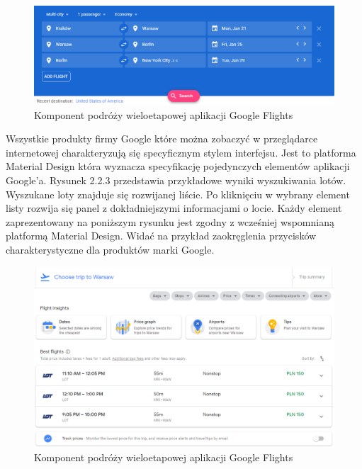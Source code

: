 \documentclass[12pt, twoside]{report}
\begin{document}
\begin{figure}[!ht]
\centering
\includegraphics[scale=0.60, keepaspectratio]{google_flights_multi.png}
\caption{Komponent podróży wieloetapowej aplikacji Google Flights}
\label{fig:google_flights_multi}
\end{figure}
Wszystkie produkty firmy Google które można zobaczyć w przeglądarce internetowej charakteryzują się specyficznym stylem interfejsu. Jest to platforma Material Design która wyznacza specyfikację pojedynczych elementów aplikacji Google'a. Rysunek 2.2.3 przedstawia przykładowe wyniki wyszukiwania lotów. Wyszukane loty znajduje się rozwijanej liście. Po kliknięciu w wybrany element listy rozwija się panel z dokładniejszymi informacjami o locie. Każdy element zaprezentowany na poniższym rysunku jest zgodny z wcześniej wspomnianą platformą Material Design. Widać na przykład zaokręglenia przycisków charakterystyczne dla produktów marki Google.
 
\begin{figure}[!ht]
\centering
\includegraphics[scale=0.50, keepaspectratio]{google_flights_result.png}
\caption{Komponent podróży wieloetapowej aplikacji Google Flights}
\label{fig:google_flights_multi}
\end{figure}

\newpage
\end{document}
